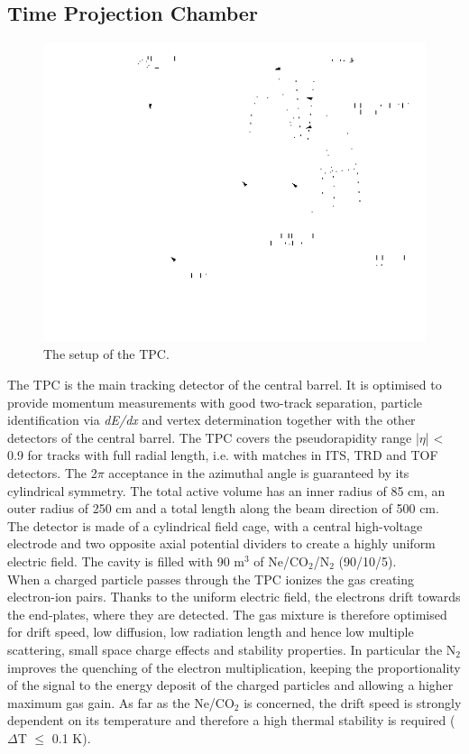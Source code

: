 \subsection*{Time Projection Chamber}
%
\begin{figure}
  \centering
  \includegraphics[scale=0.5]{figures/tpc.png}
  \caption{The setup of the TPC.}
  \label{fig:TPC}
\end{figure}
%
The TPC is the main tracking detector of the central barrel. It is optimised to provide momentum measurements with good two-track separation, particle identification via \textit{dE/dx} and vertex determination together with the other detectors of the central barrel. The TPC covers the pseudorapidity range |$\eta$| < 0.9 for tracks with full radial length, i.e. with matches in ITS, TRD and TOF detectors. The 2$\pi$ acceptance in the azimuthal angle is guaranteed by its cylindrical symmetry. The total active volume has an inner radius of 85 cm, an outer radius of 250 cm and a total length along the beam direction of 500 cm. The detector is made of a cylindrical field cage, with a central high-voltage electrode and two opposite axial potential dividers to create a highly uniform electric field. The cavity is filled with 90 m$^3$ of Ne/CO$_2$/N$_2$ (90/10/5).\\
When a charged particle passes through the TPC ionizes the gas creating electron-ion pairs. Thanks to the uniform electric field, the electrons drift towards the end-plates, where they are detected.
The gas mixture is therefore optimised for drift speed, low diffusion, low radiation length and hence low multiple scattering, small space charge effects and stability properties. In particular the N$_2$ improves the quenching of the electron multiplication, keeping the proportionality of the signal to the energy deposit of the charged particles and allowing a higher maximum gas gain. As far as the Ne/CO$_2$ is concerned, the drift speed is strongly dependent on its temperature and therefore a high thermal stability is required ($\Delta$T $\leq$ 0.1 K).\\
